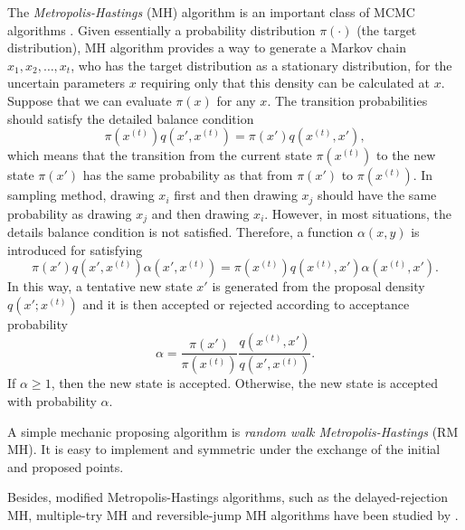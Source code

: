 The \textit{Metropolis-Hastings} (MH) algorithm is an important class of MCMC algorithms \citep{smith1993bayesian, tierney1994markov, gilks1995markov}. Given essentially a probability distribution $\pi(\cdot)$ (the target distribution), MH algorithm provides a way to generate a Markov chain $x_1, x_2,\ldots, x_t$, who has the target distribution as a stationary distribution, for the uncertain parameters $x$ requiring only that this density can be calculated at $x$. Suppose that we can evaluate $\pi(x)$ for any $x$. The transition probabilities should satisfy the detailed balance condition
\begin{equation*}
\pi\left(x^{(t)}\right)q\left(x', x^{(t)}\right) = \pi\left(x'\right)q\left(x^{(t)}, x'\right),
\end{equation*}
which means that the transition from the current state $\pi\left(x^{\left(t\right)}\right)$ to the new state $\pi\left(x'\right)$ has the same probability as that 
from $\pi\left(x'\right)$ to $\pi\left(x^{\left(t\right)}\right)$. In sampling method, drawing $x_i$ first and then drawing $x_j$ should have the same probability as drawing $x_j$ and then drawing $x_i$. However, in most situations, the details balance condition is not satisfied. Therefore, a function $\alpha\left(x,y\right)$ is introduced for satisfying 
\begin{equation*}
\pi\left(x'\right)q\left(x', x^{\left(t\right)}\right)\alpha\left(x',x^{\left(t\right)}\right) = \pi\left(x^{\left(t\right)}\right)q\left(x^{\left(t\right)}, x'\right)\alpha\left(x^{\left(t\right)},x'\right).
\end{equation*}
In this way, a tentative new state $x'$ is generated from the proposal density $q\left(x';x^{\left(t\right)}\right)$ and it is then accepted or rejected according to acceptance probability 
\begin{equation}\label{IntroAccp}
\alpha=\frac{\pi\left(x'\right)}{\pi\left(x^{\left(t\right)}\right)}\frac{q\left(x^{\left(t\right)}, x'\right)}{q\left(x', x^{\left(t\right)}\right)}.
\end{equation}
If $\alpha \geq 1$, then the new state is accepted. Otherwise, the new state is accepted with probability $\alpha$.

A simple mechanic proposing algorithm is \textit{random walk Metropolis-Hastings} (RM MH). It is easy to implement and symmetric under the exchange of the initial and proposed points. 

Besides, modified Metropolis-Hastings algorithms, such as the delayed-rejection MH, multiple-try MH and reversible-jump MH algorithms have been studied by \cite{tierney1999some, liu2000multiple, green1995reversible}. 
 

